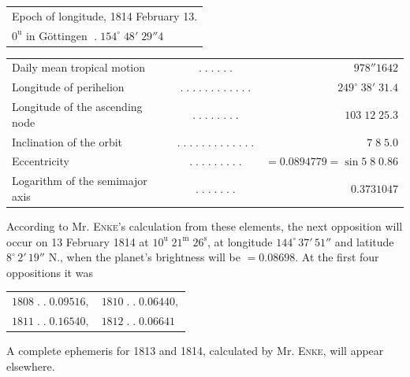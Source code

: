 \medskip
\begin{center}\fontsize{10}{12}\selectfont\setlength{\tabcolsep}{2pt}\renewcommand{\arraystretch}{1.15}\begin{tabular}{l}
Epoch of longitude, 1814 February 13.\\$0^{\mathrm u}$ in Göttingen $\; .\; 154^\circ\;48'\;29''4$
\end{tabular}\end{center}
\begin{center}\fontsize{9}{11}\selectfont\setlength{\tabcolsep}{2pt}\renewcommand{\arraystretch}{1.15}\begin{tabular}{lcr}
Daily mean tropical motion & $.\;.\;.\;.\;.\;.$ & $978''1642$\\
Longitude of perihelion & $.\;.\;.\;.\;.\;.\;.\;.\;.\;.\;.\;.$ & $249^\circ\;38'\;31.4$\\
Longitude of the ascending node & $.\;.\;.\;.\;.\;.\;.\;.$ & $103\;12\;25.3$\\
Inclination of the orbit & $.\;.\;.\;.\;.\;.\;.\;.\;.\;.\;.\;.\;.$ & $7\;8\;5.0$\\
Eccentricity & $.\;.\;.\;.\;.\;.\;.\;.\;.$ & $=0.0894779=\sin 5\;8\;0.86$\\
Logarithm of the semimajor axis & $.\;.\;.\;.\;.\;.\;.$ & $0.3731047$\\
\end{tabular}\end{center}

\par\indent According to Mr. \textsc{Enke}’s calculation from these elements, the next opposition will occur on 13 February 1814 at $10^{\mathrm u}\;21^{\mathrm m}\;26^{\mathrm s}$, at longitude $144^\circ\,37'\,51''$ and latitude $8^\circ\,2'\,19''$ N., when the planet’s brightness will be $= 0.08698$. At the first four oppositions it was

\medskip
\begin{center}\begin{tabular}{ll}$1808\;.\;.\;0.09516,$ & $1810\;.\;.\;0.06440,$\\$1811\;.\;.\;0.16540,$ & $1812\;.\;.\;0.06641$\end{tabular}\end{center}

\medskip
\noindent A complete ephemeris for 1813 and 1814, calculated by Mr. \textsc{Enke}, will appear elsewhere.

